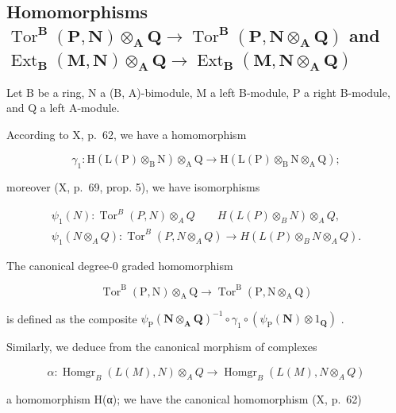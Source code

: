 \subsection{\texorpdfstring{Homomorphisms \(\operatorname{Tor}^{\mathbf{B}}(\mathbf{P},\mathbf{N})\otimes_{\mathbf{A}}\mathbf{Q}\to \operatorname{Tor}^{\mathbf{B}}(\mathbf{P},\mathbf{N}\otimes_{\mathbf{A}}\mathbf{Q})\) and \(\operatorname{Ext}_{\mathbf{B}}(\mathbf{M},\mathbf{N})\otimes_{\mathbf{A}}\mathbf{Q}\rightarrow \operatorname{Ext}_{\mathbf{B}}(\mathbf{M},\mathbf{N}\otimes_{\mathbf{A}}\mathbf{Q})\)}{Homomorphisms relating Tor and Ext to tensor products}}

Let B be a ring, N a (B, A)-bimodule, M a left B-module, P a right B-module, and Q a left A-module.

According to X, p.~62, we have a homomorphism

\[
\gamma_ {1}: \mathrm{H} (\mathrm{L} (\mathrm{P}) \otimes_ {\mathrm{B}} \mathrm{N}) \otimes_ {\mathrm{A}} \mathrm{Q} \rightarrow \mathrm{H} (\mathrm{L} (\mathrm{P}) \otimes_ {\mathrm{B}} \mathrm{N} \otimes_ {\mathrm{A}} \mathrm{Q});
\]

moreover (X, p.~69, prop. 5), we have isomorphisms

\[
\begin{array}{c} \psi_ {1} (N): \operatorname{Tor} ^ {B} (P, N) \otimes_ {A} Q \qquad H (L (P) \otimes_ {B} N) \otimes_ {A} Q, \\ \psi_ {1} (N \otimes_ {A} Q): \operatorname{Tor} ^ {B} (P, N \otimes_ {A} Q) \to H (L (P) \otimes_ {B} N \otimes_ {A} Q). \end{array}
\]

The canonical degree-0 graded homomorphism

\[
\operatorname{Tor} ^ {\mathrm{B}} (\mathrm{P}, \mathrm{N}) \otimes_ {\mathrm{A}} \mathrm{Q} \rightarrow \operatorname{Tor} ^ {\mathrm{B}} (\mathrm{P}, \mathrm{N} \otimes_ {\mathrm{A}} \mathrm{Q})\tag{9}
\]

is defined as the composite \(\psi_{\mathrm{P}}(\mathbf{N}\otimes_{\mathbf{A}}\mathbf{Q})^{-1}\circ \gamma_{1}\circ (\psi_{\mathrm{P}}(\mathbf{N})\otimes 1_{\mathbf{Q}})\) .

Similarly, we deduce from the canonical morphism of complexes

\[
\alpha : \operatorname{Homgr} _ {B} (L (M), N) \otimes_ {A} Q \rightarrow \operatorname{Homgr} _ {B} (L (M), N \otimes_ {A} Q)
\]

a homomorphism H(α); we have the canonical homomorphism (X, p.~62)

